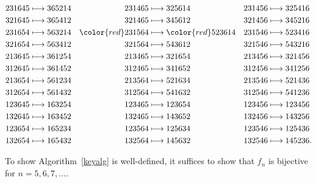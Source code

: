 \documentclass[12pt]{amsart}
\theoremstyle{definition}
\numberwithin{equation}{section}
\begin{document}
\begin{align*}
    231645 &\longmapsto 365214 & 231465 &\longmapsto 325614  & 231456 &\longmapsto 325416 \\
    321645 &\longmapsto 365412 & 321465 &\longmapsto 345612 & 321456 &\longmapsto 345216 \\
    231654 &\longmapsto 563214 & {\color{red} 231564} &\longmapsto \color{red} 523614 & 231546 &\longmapsto 523416 \\
    321654 &\longmapsto 563412 & 321564 &\longmapsto 543612 & 321546 &\longmapsto 543216 \\
    213645 &\longmapsto 361254 & 213465 &\longmapsto 321654 & 213456 &\longmapsto 321456 \\
    312645 &\longmapsto 361452 & 312465 &\longmapsto 341652 & 312456 &\longmapsto 341256 \\
    213654 &\longmapsto 561234 & 213564 &\longmapsto 521634 & 213546 &\longmapsto 521436 \\
    312654 &\longmapsto 561432 & 312564 &\longmapsto 541632 & 312546 &\longmapsto 541236 \\
    123645 &\longmapsto 163254 & 123465 &\longmapsto 123654 & 123456 &\longmapsto 123456 \\
    132645 &\longmapsto 163452 & 132465 &\longmapsto 143652 & 132456 &\longmapsto 143256 \\
    123654 &\longmapsto 165234 & 123564 &\longmapsto 125634 & 123546 &\longmapsto 125436 \\
    132654 &\longmapsto 165432 & 132564 &\longmapsto 145632 & 132546 &\longmapsto 145236.
\end{align*}

To show Algorithm~\ref{keyalg} is well-defined, it suffices to show that $f_n$ is bijective for $n=5,6,7,\dotsc$.
\end{document}
